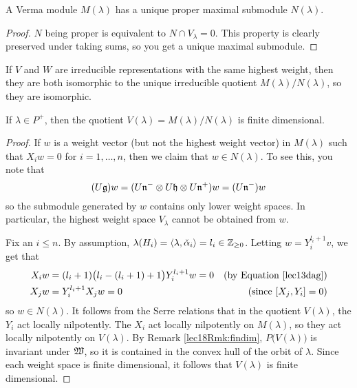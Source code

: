  \begin{lemma}\label{lec18Lem:maxlprop}
   A Verma module $M(\lambda)$ has a unique proper maximal submodule $N(\lambda)$.
 \end{lemma}
 \begin{proof}
   $N$ being proper is equivalent to $N\cap V_\lambda = 0$. This property is clearly
   preserved under taking sums, so you get a unique maximal submodule.
 \end{proof}
 \begin{remark}\label{lec18Rmk:injectivity}
   If $V$ and $W$ are irreducible representations with the same highest weight,
   then they are both isomorphic to the unique irreducible quotient
   $M(\lambda)/N(\lambda)$, so they are isomorphic.
 \end{remark}
 \begin{lemma}\label{lec18Lem:Vlfindim}
   If $\lambda\in P^+$, then the quotient $V(\lambda) = M(\lambda)/N(\lambda)$ is
   finite dimensional.
 \end{lemma}
 \begin{proof}
   If $w$ is a weight vector (but not the highest weight vector) in $M(\lambda)$
   such that $X_iw=0$ for $i=1,\dots, n$, then we claim that $w\in N(\lambda)$. To see
   this, you note that
   \[
      (U\mathfrak{g})w = (U\mathfrak{n}^-\otimes U\mathfrak{h}\otimes U\mathfrak{n}^+)w = (U\mathfrak{n}^-)w
   \]
   so the submodule generated by $w$ contains only lower weight spaces. In particular,
   the highest weight space $V_\lambda$ cannot be obtained from $w$.

   Fix an $i\le n$. By assumption, $\lambda(H_i)=\langle \lambda, \check
   \alpha_i\rangle = l_i\in \mathbb{Z}_{\ge 0}$. Letting $w = Y_i^{l_i+1}v$, we get
   that
   \begin{align*}
     X_iw &= (l_i+1)\bigl(l_i-(l_i+1)+1\bigr) Y_i^{l_i+1}w =0 &
            \text{(by Equation \ref{lec13dag})}\\
     X_jw &= Y_i^{l_i+1} X_j w = 0 & \text{(since $[X_j,Y_i]=0$)}
   \end{align*}
   so $w\in N(\lambda)$. It follows from the Serre relations that in the quotient $V(\lambda)$, the $Y_i$ act locally
   nilpotently. The $X_i$ act locally nilpotently on $M(\lambda)$, so they act locally
   nilpotently on $V(\lambda)$. By Remark \ref{lec18Rmk:findim},
   $P\bigl(V(\lambda)\bigr)$ is invariant under $\mathfrak{W}$, so it is contained in the convex
   hull of the orbit of $\lambda$. Since each weight space is finite dimensional, it
   follows that $V(\lambda)$ is finite dimensional.
 \end{proof}

